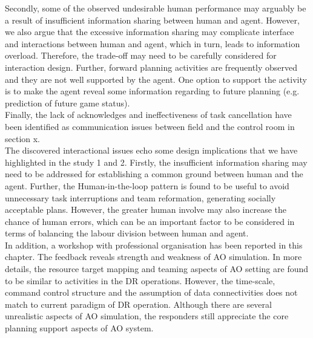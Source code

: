 Secondly, some of the observed undesirable human performance may arguably be a result of insufficient information sharing between human and agent. However, we also argue that the excessive information sharing may complicate interface and interactions between human and agent, which in turn, leads to information overload. Therefore, the trade-off may need to be carefully considered for interaction design. Further, forward planning  activities are frequently observed and they are not well supported by the agent. One option to support the activity is to make the agent reveal some information regarding to future planning (e.g. prediction of future game status).\\

Finally, the lack of acknowledges and ineffectiveness of task cancellation have been identified as communication issues between field and the control room in section x. \\

The discovered interactional issues echo some design implications that we have highlighted in the study 1 and 2. Firstly, the insufficient information sharing may need to be addressed for establishing a common ground between human and the agent. Further, the Human-in-the-loop pattern is found to be useful to avoid unnecessary task interruptions and team reformation, generating socially acceptable plans. However, the greater human involve may also increase the chance of human errors, which can be an important factor to be considered in terms of balancing the labour division between human and agent. \\


In addition, a workshop with professional organisation has been reported in this chapter. The feedback reveals strength and weakness of AO simulation. In more details, the resource target mapping and teaming aspects of AO setting are found to be similar to activities in the DR operations. However, the time-scale, command control structure and the assumption of data connectivities does not match to current paradigm of DR operation. Although there are several unrealistic aspects of AO simulation, the responders still appreciate the core planning support aspects of AO system.\\

